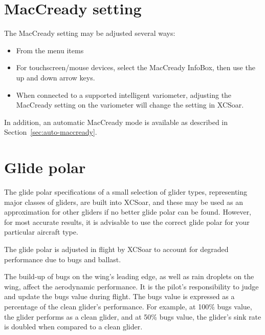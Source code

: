 \documentclass[a4paper,12pt]{refrep}
\begin{document}
\section{MacCready setting}

The MacCready setting may be adjusted several ways:
\begin{itemize}
\item From the menu items
\begin{quote}
\blink{} 

\blink{}
\end{quote}
\item For touchscreen/mouse devices, select the MacCready InfoBox, then
  use the up and down arrow keys.
\item When connected to a supported intelligent variometer, adjusting
  the MacCready setting on the variometer will change the setting
  in XCSoar.
\end{itemize}
In addition, an automatic MacCready mode is available as described in
Section~\ref{sec:auto-maccready}.

\section{Glide polar}

The glide polar specifications of a small selection of glider types,
representing major classes of gliders, are built into XCSoar, and
these may be used as an approximation for other gliders if no better
glide polar can be found.  However, for most accurate results, it is
advisable to use the correct glide polar for your particular aircraft
type.

The glide polar is adjusted in flight by XCSoar to account for
degraded performance due to bugs and ballast.

The build-up of bugs on the wing's leading edge, as well as rain
droplets on the wing, affect the aerodynamic performance.  It is the
pilot's responsibility to judge and update the bugs value during
flight.  The bugs value is expressed as a percentage of the clean
glider's performance.  For example, at 100\% bugs value, the glider
performs as a clean glider, and at 50\% bugs value, the glider's sink
rate is doubled when compared to a clean glider.


\end{document}
